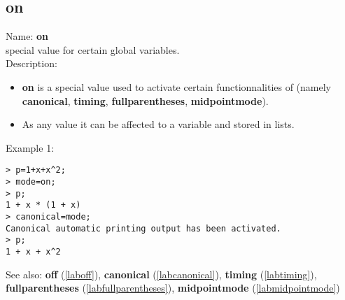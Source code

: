 \subsection{on}
\label{labon}
\noindent Name: \textbf{on}\\
special value for certain global variables.\\
\noindent Description: \begin{itemize}

\item \textbf{on} is a special value used to activate certain functionnalities of \sollya
   (namely \textbf{canonical}, \textbf{timing}, \textbf{fullparentheses}, \textbf{midpointmode}).

\item As any value it can be affected to a variable and stored in lists.
\end{itemize}
\noindent Example 1: 
\begin{center}\begin{minipage}{15cm}\begin{Verbatim}[frame=single]
> p=1+x+x^2;
> mode=on;
> p;
1 + x * (1 + x)
> canonical=mode;
Canonical automatic printing output has been activated.
> p;
1 + x + x^2
\end{Verbatim}
\end{minipage}\end{center}
See also: \textbf{off} (\ref{laboff}), \textbf{canonical} (\ref{labcanonical}), \textbf{timing} (\ref{labtiming}), \textbf{fullparentheses} (\ref{labfullparentheses}), \textbf{midpointmode} (\ref{labmidpointmode})
